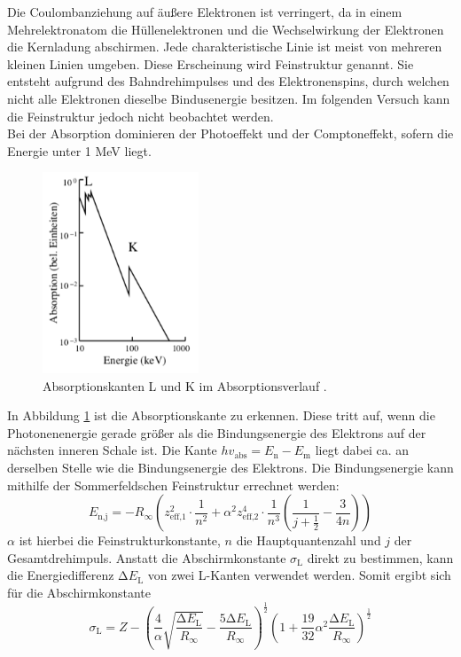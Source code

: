 Die Coulombanziehung auf äußere Elektronen ist verringert, da in einem Mehrelektronatom die Hüllenelektronen und die Wechselwirkung der Elektronen die Kernladung abschirmen. \*
Jede charakteristische Linie ist meist von mehreren kleinen Linien umgeben. Diese Erscheinung wird Feinstruktur genannt. Sie entsteht aufgrund des Bahndrehimpulses und des Elektronenspins, durch welchen nicht alle Elektronen dieselbe Bindusenergie besitzen. Im folgenden Versuch kann die Feinstruktur jedoch nicht beobachtet werden. 
\\
Bei der Absorption dominieren der Photoeffekt und der Comptoneffekt, sofern die Energie unter 1 MeV liegt. 
\begin{figure}[h]
    \centering
    \includegraphics[height=6cm]{Theorie/T1.pdf}
    \caption{Absorptionskanten L und K im Absorptionsverlauf \cite{1}.}
    \label{fig:T1}
\end{figure}
In Abbildung \ref{fig:T1} ist die Absorptionskante zu erkennen. Diese tritt auf, wenn die Photonenenergie gerade größer als die Bindungsenergie des Elektrons auf der nächsten inneren Schale ist. Die Kante $hv_\text{abs} = E_\text{n} - E_\text{m}$ liegt dabei ca. an derselben Stelle wie die Bindungsenergie des Elektrons. \*
Die Bindungsenergie kann mithilfe der Sommerfeldschen Feinstruktur errechnet werden:
\begin{equation}
\label{eq:3}
	E_\text{n,j} = - R_{\infty} \left(z_\text{eff,1}^2 \cdot \frac{1}{n^2} + \alpha^2 z_\text{eff,2}^4 \cdot \frac{1}{n^3} \left(\frac{1}{j + 	\frac{1}{2}} - \frac{3}{4n} \right)\right)
\end{equation}
$\alpha$ ist hierbei die Feinstrukturkonstante, $n$ die Hauptquantenzahl und $j$ der Gesamtdrehimpuls. Anstatt die Abschirmkonstante $\sigma_\text{L}$ direkt zu bestimmen, kann die Energiedifferenz $\increment E_\text{L}$ von zwei L-Kanten verwendet werden. Somit ergibt sich für die Abschirmkonstante
\begin{equation}
\label{eq:4}
	\sigma_{\text{L}} = Z - \left(\frac{4}{\alpha} \sqrt{\frac{\increment E_{\text{L}}}{R_\infty}} - \frac{5 \increment E_{\text{L}}}		{R_\infty}\right)^\frac{1}{2} \left(1 +
 	\frac{19}{32} \alpha^2 \frac{\increment E_{\text{L}}}{R_\infty}\right)^\frac{1}{2}
\end{equation}
